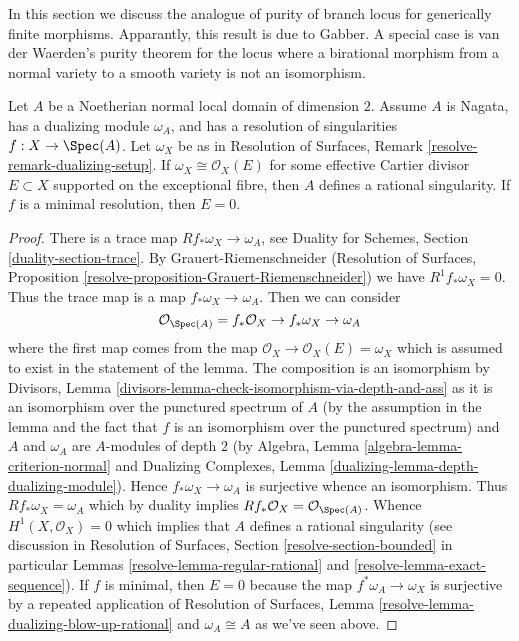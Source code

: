 \noindent
In this section we discuss the analogue of purity of branch locus for
generically finite morphisms. Apparantly, this result is due to Gabber.
A special case is van der Waerden's purity theorem for the locus where
a birational morphism from a normal variety to a smooth variety is not
an isomorphism.

\begin{lemma}
\label{lemma-characterize-rational-singularity}
Let $A$ be a Noetherian normal local domain of dimension $2$.
Assume $A$ is Nagata, has a dualizing module $\omega_A$, and has a
resolution of singularities $f : X \to \Spec(A)$.
Let $\omega_X$ be as in Resolution of Surfaces,
Remark \ref{resolve-remark-dualizing-setup}.
If $\omega_X \cong \mathcal{O}_X(E)$ for some effective
Cartier divisor $E \subset X$ supported on the exceptional
fibre, then $A$ defines a rational singularity.
If $f$ is a minimal resolution, then $E = 0$.
\end{lemma}

\begin{proof}
There is a trace map $Rf_*\omega_X \to \omega_A$, see
Duality for Schemes, Section \ref{duality-section-trace}.
By Grauert-Riemenschneider
(Resolution of Surfaces,
Proposition \ref{resolve-proposition-Grauert-Riemenschneider})
we have $R^1f_*\omega_X = 0$.
Thus the trace map is a map $f_*\omega_X \to \omega_A$.
Then we can consider
$$
\mathcal{O}_{\Spec(A)} = f_*\mathcal{O}_X \to f_*\omega_X \to \omega_A
$$
where the first map comes from the map
$\mathcal{O}_X \to \mathcal{O}_X(E) = \omega_X$ which is
assumed to exist in the statement of the lemma.
The composition is an isomorphism by Divisors, Lemma
\ref{divisors-lemma-check-isomorphism-via-depth-and-ass}
as it is an isomorphism over the punctured spectrum of $A$
(by the assumption in the lemma and the fact that $f$ is an isomorphism
over the punctured spectrum) and $A$ and $\omega_A$
are $A$-modules of depth $2$ (by
Algebra, Lemma \ref{algebra-lemma-criterion-normal} and
Dualizing Complexes, Lemma \ref{dualizing-lemma-depth-dualizing-module}).
Hence $f_*\omega_X \to \omega_A$ is surjective whence an isomorphism.
Thus $Rf_*\omega_X = \omega_A$ which by duality implies
$Rf_*\mathcal{O}_X = \mathcal{O}_{\Spec(A)}$.
Whence $H^1(X, \mathcal{O}_X) = 0$ which implies that $A$
defines a rational singularity (see discussion in
Resolution of Surfaces, Section
\ref{resolve-section-bounded} in particular
Lemmas \ref{resolve-lemma-regular-rational} and
\ref{resolve-lemma-exact-sequence}).
If $f$ is minimal, then $E = 0$ because the map
$f^*\omega_A \to \omega_X$ is surjective by
a repeated application of Resolution of Surfaces, Lemma
\ref{resolve-lemma-dualizing-blow-up-rational}
and $\omega_A \cong A$ as we've seen above.
\end{proof}

